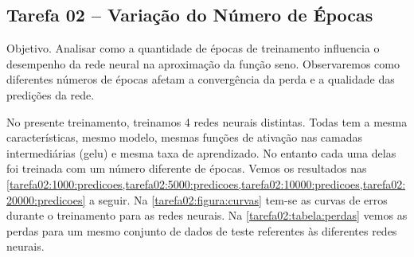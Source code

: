 \subsection{Tarefa 02 -- Variação do Número de Épocas}

\begin{comandoquestao}
    Objetivo. Analisar como a quantidade de épocas de treinamento influencia o desempenho da rede neural na aproximação da função seno. Observaremos como diferentes números de épocas afetam a convergência da perda e a qualidade das predições da rede.
\end{comandoquestao}

No presente treinamento, treinamos 4 redes neurais distintas. Todas tem a mesma 
características, mesmo modelo, mesmas funções de ativação nas camadas 
intermediárias (gelu) e mesma taxa de aprendizado. No entanto cada uma delas 
foi treinada com um número diferente de épocas. Vemos os resultados nas 
\cref{tarefa02:1000:predicoes,tarefa02:5000:predicoes,tarefa02:10000:predicoes,tarefa02:20000:predicoes}
 a seguir. Na \cref{tarefa02:figura:curvas} tem-se as curvas de erros durante o 
treinamento para as redes neurais. Na \cref{tarefa02:tabela:perdas} vemos as 
perdas para um mesmo conjunto de dados de teste referentes às diferentes redes 
neurais.


